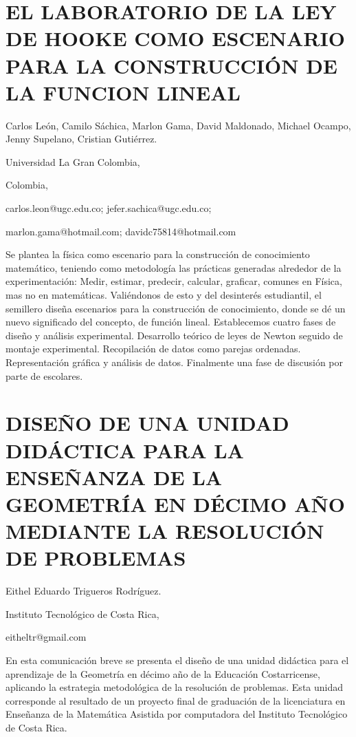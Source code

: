 \section{EL LABORATORIO DE LA LEY DE HOOKE COMO ESCENARIO PARA LA CONSTRUCCIÓN
DE LA FUNCION LINEAL}

\begin{datos}

Carlos León, Camilo Sáchica, Marlon Gama, David Maldonado, Michael
Ocampo, Jenny Supelano, Cristian Gutiérrez.

Universidad La Gran Colombia,

Colombia,

carlos.leon@ugc.edu.co; jefer.sachica@ugc.edu.co;

marlon.gama@hotmail.com; davidc75814@hotmail.com

\end{datos}

Se plantea la física como escenario para la construcción de conocimiento
matemático, teniendo como metodología las prácticas generadas alrededor
de la experimentación: Medir, estimar, predecir, calcular, graficar,
comunes en Física, mas no en matemáticas. Valiéndonos de esto y del
desinterés estudiantil, el semillero diseña escenarios para la construcción
de conocimiento, donde se dé un nuevo significado del concepto, de
función lineal. Establecemos cuatro fases de diseño y análisis experimental.
Desarrollo teórico de leyes de Newton seguido de montaje experimental.
Recopilación de datos como parejas ordenadas. Representación gráfica
y análisis de datos. Finalmente una fase de discusión por parte de
escolares.

\setcounter{section}{36}


\section{DISEÑO DE UNA UNIDAD DIDÁCTICA PARA LA ENSEÑANZA DE LA GEOMETRÍA
EN DÉCIMO AÑO MEDIANTE LA RESOLUCIÓN DE PROBLEMAS }

\begin{datos}

Eithel Eduardo Trigueros Rodríguez.

Instituto Tecnológico de Costa Rica,

eitheltr@gmail.com

\end{datos}

En esta comunicación breve se presenta el diseño de una unidad didáctica
para el aprendizaje de la Geometría en décimo año de la Educación
Costarricense, aplicando la estrategia metodológica de la resolución
de problemas. Esta unidad corresponde al resultado de un proyecto
final de graduación de la licenciatura en Enseñanza de la Matemática
Asistida por computadora del Instituto Tecnológico de Costa Rica.


